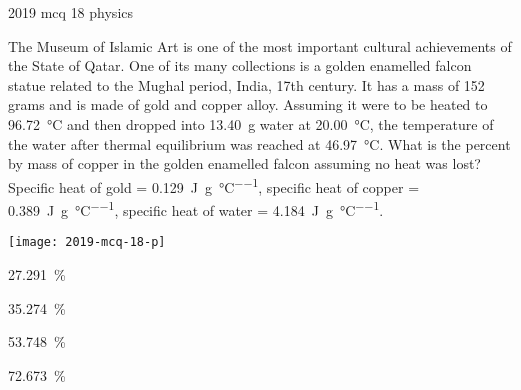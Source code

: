 \ylDisplay
{}%
{2019}%
{mcq}%
{18}%
{physics}%
{}%
{
\ifStatement
The Museum of Islamic Art is one of the most important cultural achievements of the State of Qatar. One of its many collections is a golden enamelled falcon statue related to the  Mughal period, India, 17th century. It has a mass of 152 grams and is made of gold and copper alloy. Assuming it were to be heated to \SI{96.72}{\degreeCelsius} and then dropped into \SI{13.40}{\g} water at \SI{20.00}{\degreeCelsius}, the temperature of the water after thermal equilibrium was reached at \SI{46.97}{\degreeCelsius}. What is the percent by mass of copper in  the golden enamelled falcon assuming no heat was lost? Specific heat of gold = \SI{0.129}{\J\per\g\per\degreeCelsius}, specific heat of copper  = \SI{0.389}{\J\per\g\per\degreeCelsius}, specific heat of water = \SI{4.184}{\J\per\g\per\degreeCelsius}.
\begin{center}
  \texttt{[image: 2019-mcq-18-p]}
\end{center}
\fi


\SI{27.291}{\percent}
\fi


\SI{35.274}{\percent}
\fi


\SI{53.748}{\percent}
\fi


\SI{72.673}{\percent}
\fi


\ifHint

\fi


\ifSolution

\fi


\ifEstStatement

\fi



\fi



\fi



\fi



\fi


\ifEstHint

\fi


\ifEstSolution

\fi
}
